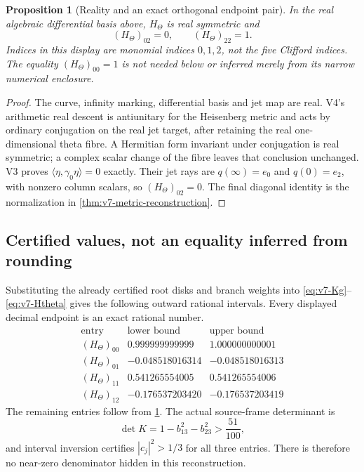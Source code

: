 \documentclass[11pt]{article}
\newtheorem{proposition}[proposition]{Proposition}
\theoremstyle{definition}
\theoremstyle{remark}
\begin{document}
\begin{proposition}[Reality and an exact orthogonal endpoint pair]
\label{prop:v7-metric-real}
In the real algebraic differential basis above, $H_\Theta$ is real symmetric
and
\begin{equation}
 \boxed{(H_\Theta)_{02}=0,\qquad (H_\Theta)_{22}=1.}
 \label{eq:v7-metric-zero}
\end{equation}
Indices in this display are monomial indices $0,1,2$, not the five Clifford
indices. The equality $(H_\Theta)_{00}=1$ is \emph{not} needed below or
inferred merely from its narrow numerical enclosure.
\end{proposition}
\begin{proof}
The curve, infinity marking, differential basis and jet map are real. V4's
arithmetic real descent is antiunitary for the Heisenberg metric and acts by
ordinary conjugation on the real jet target, after retaining the real
one-dimensional theta fibre. A Hermitian form invariant under conjugation is
real symmetric; a complex scalar change of the fibre leaves that conclusion
unchanged. V3 proves $\langle\eta,\gamma_0\eta\rangle=0$ exactly. Their
jet rays are $q(\infty)=e_0$ and $q(0)=e_2$, with nonzero column scalars, so
$(H_\Theta)_{02}=0$. The final diagonal identity is the normalization in
\cref{thm:v7-metric-reconstruction}.
\end{proof}

\subsection{Certified values, not an equality inferred from rounding}
Substituting the already certified root disks and branch weights into
\eqref{eq:v7-Kg}--\eqref{eq:v7-Htheta} gives the following outward rational
intervals. Every displayed decimal endpoint is an exact rational number.
\begin{equation}
\begin{array}{c|cc}
\text{entry}&\text{lower bound}&\text{upper bound}\\ \hline
(H_\Theta)_{00}&0.999999999999&1.000000000001\\
(H_\Theta)_{01}&-0.048518016314&-0.048518016313\\
(H_\Theta)_{11}&0.541265554005&0.541265554006\\
(H_\Theta)_{12}&-0.176537203420&-0.176537203419
\end{array}
\label{eq:v7-metric-intervals}
\end{equation}
The remaining entries follow from \cref{prop:v7-metric-real}.
The actual source-frame determinant is
\begin{equation}
 \det K=1-b_{13}^2-b_{23}^2>\frac{51}{100},
 \label{eq:v7-K-floor}
\end{equation}
and interval inversion certifies $|c_j|^2>1/3$ for all three entries.
There is therefore no near-zero denominator hidden in this reconstruction.
\end{document}
